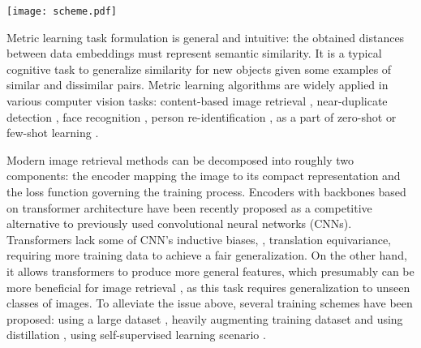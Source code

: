 \documentclass[10pt,twocolumn,letterpaper]{article}
\begin{document}
\begin{figure*}
\begin{center}
\texttt{[image: scheme.pdf]}
\caption{Overview of the proposed method. Two images representing one class (positives) are encoded with the vision transformer, projected into a space of a lower dimension with a fully connected (FC) layer, and then mapped to a hyperbolic space. Blue stars depict the resulting embeddings. Poincar\'e disk is shown with uniform triangle tiling on the background to illustrate the manifold curvature. Gray circles represent other samples from the batch (negatives). Finally, arrows in the disk represent distances used in the pairwise cross-entropy loss. Positives are pushed closer to each other, negative are pulled far apart.}
\label{fig:scheme}
\end{center}
\end{figure*}

Metric learning task formulation is general and intuitive: the obtained distances between data embeddings must represent semantic similarity. It is a typical cognitive task to generalize similarity for new objects given some examples of similar and dissimilar pairs. Metric learning algorithms are widely applied in various computer vision tasks: content-based image retrieval \cite{NPair,ProxyNCA,sop}, near-duplicate detection \cite{zheng2016improving}, face recognition \cite{sphereface,facenet}, person re-identification \cite{chen2017triplet,xiao2017joint}, as a part of zero-shot \cite{sop} or few-shot learning \cite{qiao2019transductive,snell2017prototypical,sung2018learning}.


Modern image retrieval methods can be decomposed into roughly two components: the encoder mapping the image to its compact representation and the loss function governing the training process. Encoders with backbones based on transformer architecture have been recently proposed as a competitive alternative to previously used convolutional neural networks (CNNs). Transformers lack some of CNN's inductive biases, \eg, translation equivariance, requiring more training data to achieve a fair generalization. On the other hand, it allows transformers to produce more general features, which presumably can be more beneficial for image retrieval \cite{IRT,dino}, as this task requires generalization to unseen classes of images. To alleviate the issue above, several training schemes have been proposed: using a large dataset \cite{vit}, heavily augmenting training dataset and using distillation \cite{deit}, using self-supervised learning scenario \cite{dino}. 
\end{document}
